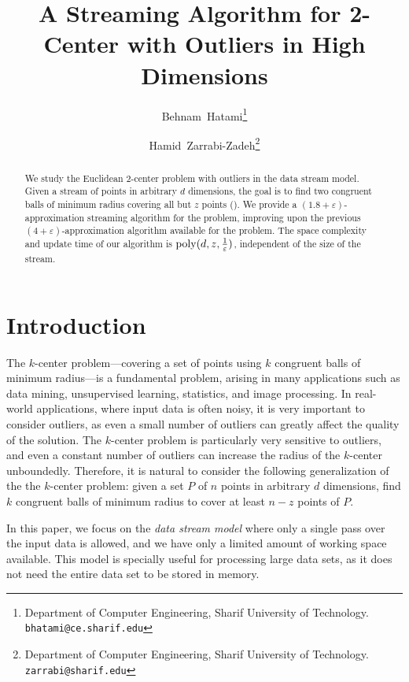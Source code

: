 \documentclass[envcountsame]{cls/cccg15}
\title{A Streaming Algorithm for 2-Center with Outliers in High Dimensions}
\author{Behnam~Hatami\thanks{Department of Computer Engineering, 
	Sharif University of Technology.
	{\tt bhatami@ce.sharif.edu}}
	\and 
	Hamid~Zarrabi-Zadeh\thanks{Department of Computer Engineering, 
	Sharif University of Technology.
	{\tt zarrabi@sharif.edu}}
}
\newcommand{\poly}{\mathop{\mathrm{poly}}}
\newcommand{\eps}{\varepsilon}
\begin{document}
\maketitle
\pagestyle{plain}


\begin{abstract}
We study the Euclidean 2-center problem with outliers in the data stream model. 
Given a stream of points in arbitrary $d$ dimensions, the goal is to find two congruent balls 
of minimum radius covering all but $z$ points (). 
We provide a $(1.8+\eps)$-approximation streaming algorithm for the problem, 
improving upon the previous $(4 + \eps)$-approximation algorithm available for the problem.
The space complexity and update time of our algorithm is $\poly(d, z, {1 \over \eps})$,
independent of the size of the stream.
\end{abstract}


\section{Introduction}
The $k$-center problem---covering a set of points 
using $k$ congruent balls of minimum radius---is a fundamental problem,
arising in many applications 
such as data mining, unsupervised learning, statistics, and image processing.
In real-world applications, where input data is often noisy, 
it is very important to consider outliers, 
as even a small number of outliers can greatly affect the quality of the solution.
The $k$-center problem is particularly very sensitive to outliers,
and even a constant number of outliers can increase the radius of the $k$-center unboundedly.
Therefore, it is natural to consider the following generalization of
the the $k$-center problem: %
given a set $P$ of $n$ points in arbitrary $d$ dimensions, 
find $k$ congruent balls of minimum radius 
to cover at least $n - z$ points of $P$.

In this paper, we focus on the \emph{data stream model}
where only a single pass over the input data is allowed,
and we have only a limited amount of working space available.
This model is specially useful for processing large data sets,
as it does not need the entire data set to be stored in memory.
\end{document}
